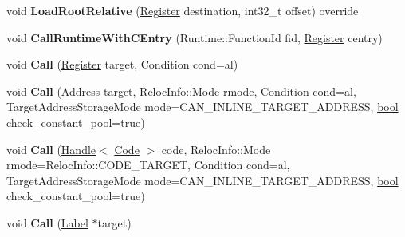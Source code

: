 \begin{DoxyCompactItemize}
\item 
\mbox{\label{classv8_1_1internal_1_1TurboAssembler_a77e9d10255bc9a25985ff71df883e665}} 
void {\bfseries Load\+Root\+Relative} (\mbox{\hyperlink{classv8_1_1internal_1_1Register}{Register}} destination, int32\+\_\+t offset) override
\item 
\mbox{\label{classv8_1_1internal_1_1TurboAssembler_a402a6ba1a950da97bcbbf500be586951}} 
void {\bfseries Call\+Runtime\+With\+C\+Entry} (Runtime\+::\+Function\+Id fid, \mbox{\hyperlink{classv8_1_1internal_1_1Register}{Register}} centry)
\item 
\mbox{\label{classv8_1_1internal_1_1TurboAssembler_ae1557727743e92aa5e8d08bd06a5d7ee}} 
void {\bfseries Call} (\mbox{\hyperlink{classv8_1_1internal_1_1Register}{Register}} target, Condition cond=al)
\item 
\mbox{\label{classv8_1_1internal_1_1TurboAssembler_aa8db54e4e3ae4f7802124532f2f8138b}} 
void {\bfseries Call} (\mbox{\hyperlink{classuintptr__t}{Address}} target, Reloc\+Info\+::\+Mode rmode, Condition cond=al, Target\+Address\+Storage\+Mode mode=C\+A\+N\+\_\+\+I\+N\+L\+I\+N\+E\+\_\+\+T\+A\+R\+G\+E\+T\+\_\+\+A\+D\+D\+R\+E\+SS, \mbox{\hyperlink{classbool}{bool}} check\+\_\+constant\+\_\+pool=true)
\item 
\mbox{\label{classv8_1_1internal_1_1TurboAssembler_a833b776afcf46bc399818ec10c5c2069}} 
void {\bfseries Call} (\mbox{\hyperlink{classv8_1_1internal_1_1Handle}{Handle}}$<$ \mbox{\hyperlink{classv8_1_1internal_1_1Code}{Code}} $>$ code, Reloc\+Info\+::\+Mode rmode=Reloc\+Info\+::\+C\+O\+D\+E\+\_\+\+T\+A\+R\+G\+ET, Condition cond=al, Target\+Address\+Storage\+Mode mode=C\+A\+N\+\_\+\+I\+N\+L\+I\+N\+E\+\_\+\+T\+A\+R\+G\+E\+T\+\_\+\+A\+D\+D\+R\+E\+SS, \mbox{\hyperlink{classbool}{bool}} check\+\_\+constant\+\_\+pool=true)
\item 
\mbox{\label{classv8_1_1internal_1_1TurboAssembler_a76c1a7002369fba1c520446e9e4cfc34}} 
void {\bfseries Call} (\mbox{\hyperlink{classv8_1_1internal_1_1Label}{Label}} $\ast$target)
\item 

\end{DoxyCompactItemize}
